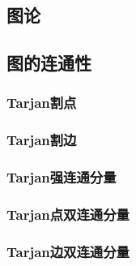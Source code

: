 \documentclass{article}
\begin{document}
\begin{multicols*}{2}

\thispagestyle{empty}
\tableofcontents
\newpage
\setcounter{page}{1}
\section{图论}
\subsection{图的连通性}
\subsubsection{Tarjan割点}
\begin{small}

\end{small}

\subsubsection{Tarjan割边}
\begin{small}

\end{small}

\subsubsection{Tarjan强连通分量}
\begin{small}

\end{small}

\subsubsection{Tarjan点双连通分量}
\begin{small}

\end{small}

\subsubsection{Tarjan边双连通分量}
\begin{small}

\end{small}


\end{multicols*}
\end{document}

